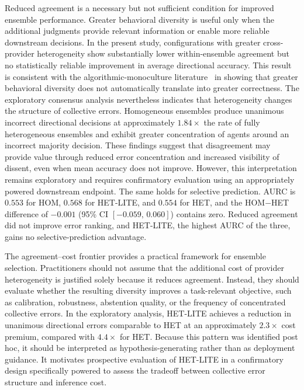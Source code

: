 \documentclass{ieeeaccess}
\begin{document}
Reduced agreement is a necessary but not sufficient condition for improved
ensemble performance. Greater behavioral diversity is useful only when the
additional judgments provide relevant information or enable more reliable
downstream decisions. In the present study, configurations with greater
cross-provider heterogeneity show substantially lower within-ensemble agreement
but no statistically reliable improvement in average directional accuracy. This result
is consistent with the algorithmic-monoculture
literature~\cite{kim2025correlated} in showing that greater behavioral diversity
does not automatically translate into greater correctness. The exploratory
consensus analysis nevertheless indicates that heterogeneity changes the
structure of collective errors. Homogeneous ensembles produce unanimous
incorrect directional decisions at approximately $1.84\times$ the rate of fully
heterogeneous ensembles and exhibit greater concentration of agents around an
incorrect majority decision. These findings suggest that disagreement may
provide value through reduced error concentration and increased visibility of
dissent, even when mean accuracy does not improve. However, this interpretation
remains exploratory and requires confirmatory evaluation using an appropriately
powered downstream endpoint. The same holds for selective prediction. AURC is
$0.553$ for HOM, $0.568$ for HET-LITE, and $0.554$ for HET, and the HOM$-$HET
difference of $-0.001$ (95\% CI $[-0.059,\,0.060]$) contains zero. Reduced
agreement did not improve error ranking, and HET-LITE, the highest AURC of the
three, gains no selective-prediction advantage.

The agreement--cost frontier provides a practical framework for ensemble
selection. Practitioners should not assume that the additional cost of provider
heterogeneity is justified solely because it reduces agreement. Instead, they
should evaluate whether the resulting diversity improves a task-relevant
objective, such as calibration, robustness, abstention quality, or the frequency
of concentrated collective errors. In the exploratory analysis, HET-LITE
achieves a reduction in unanimous directional errors comparable to HET at an
approximately $2.3\times$ cost premium, compared with $4.4\times$ for HET. Because
this pattern was identified post hoc, it should be interpreted as
hypothesis-generating rather than as deployment guidance. It motivates
prospective evaluation of HET-LITE in a confirmatory design specifically powered
to assess the tradeoff between collective error structure and inference cost.
\end{document}

